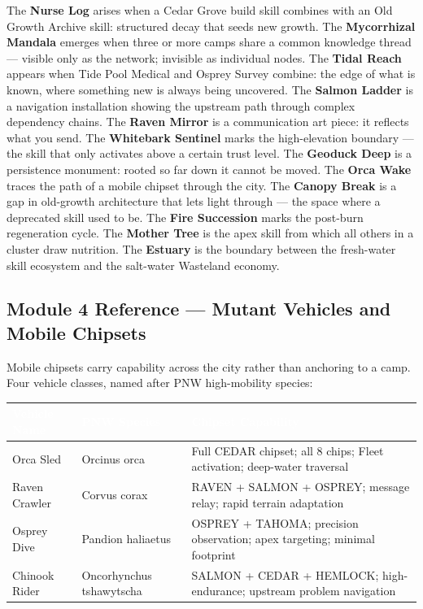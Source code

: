 \documentclass[11pt,letterpaper]{article}
\newcommand{\tableheader}[1]{\textbf{\sffamily\textcolor{white}{#1}}}
\begin{document}
The \textbf{Nurse Log} arises when a Cedar Grove build skill combines with an Old Growth Archive skill: structured decay that seeds new growth. The \textbf{Mycorrhizal Mandala} emerges when three or more camps share a common knowledge thread --- visible only as the network; invisible as individual nodes. The \textbf{Tidal Reach} appears when Tide Pool Medical and Osprey Survey combine: the edge of what is known, where something new is always being uncovered. The \textbf{Salmon Ladder} is a navigation installation showing the upstream path through complex dependency chains. The \textbf{Raven Mirror} is a communication art piece: it reflects what you send. The \textbf{Whitebark Sentinel} marks the high-elevation boundary --- the skill that only activates above a certain trust level. The \textbf{Geoduck Deep} is a persistence monument: rooted so far down it cannot be moved. The \textbf{Orca Wake} traces the path of a mobile chipset through the city. The \textbf{Canopy Break} is a gap in old-growth architecture that lets light through --- the space where a deprecated skill used to be. The \textbf{Fire Succession} marks the post-burn regeneration cycle. The \textbf{Mother Tree} is the apex skill from which all others in a cluster draw nutrition. The \textbf{Estuary} is the boundary between the fresh-water skill ecosystem and the salt-water Wasteland economy.

\subsection{Module 4 Reference --- Mutant Vehicles and Mobile Chipsets}

Mobile chipsets carry capability across the city rather than anchoring to a camp. Four vehicle classes, named after PNW high-mobility species:

\begin{center}
\begin{tabularx}{\textwidth}{L{2.5cm}L{3cm}X}
\toprule
{}
\tableheader{Vehicle Name} & \tableheader{PNW Species} & \tableheader{Chipset Capability} \\
\midrule
Orca Sled & Orcinus orca & Full CEDAR chipset; all 8 chips; Fleet activation; deep-water traversal \\
Raven Crawler & Corvus corax & RAVEN + SALMON + OSPREY; message relay; rapid terrain adaptation \\
Osprey Dive & Pandion haliaetus & OSPREY + TAHOMA; precision observation; apex targeting; minimal footprint \\
Chinook Rider & Oncorhynchus tshawytscha & SALMON + CEDAR + HEMLOCK; high-endurance; upstream problem navigation \\
\bottomrule
\end{tabularx}
\end{center}
\end{document}
